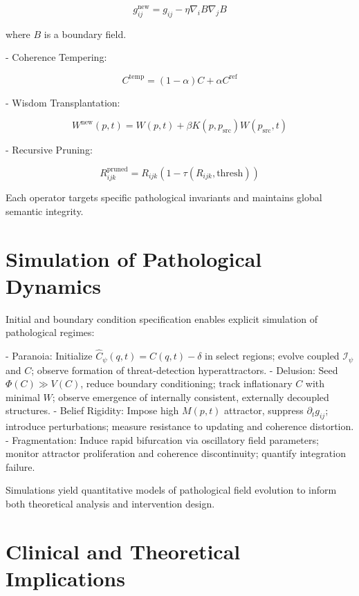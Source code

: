 \begin{equation}
g_{ij}^{\text{new}} = g_{ij} - \eta \nabla_i B \nabla_j B
\end{equation}

where $B$ is a boundary field.

- Coherence Tempering:

\begin{equation}
C^{\text{temp}} = (1-\alpha)C + \alpha C^{\text{ref}}
\end{equation}

- Wisdom Transplantation:

\begin{equation}
W^{\text{new}}(p,t) = W(p,t) + \beta K(p,p_{\text{src}}) W(p_{\text{src}},t)
\end{equation}

- Recursive Pruning:

\begin{equation}
R_{ijk}^{\text{pruned}} = R_{ijk} (1 - \tau(R_{ijk}, \text{thresh}))
\end{equation}

Each operator targets specific pathological invariants and maintains global semantic integrity.

\section{Simulation of Pathological Dynamics}

Initial and boundary condition specification enables explicit simulation of pathological regimes:

- Paranoia: Initialize $\hat{C}_{\psi}(q,t) = C(q,t) - \delta$ in select regions; evolve coupled $\mathcal{I}_{\psi}$ and $C$; observe formation of threat-detection hyperattractors.
- Delusion: Seed $\Phi(C) \gg V(C)$, reduce boundary conditioning; track inflationary $C$ with minimal $W$; observe emergence of internally consistent, externally decoupled structures.
- Belief Rigidity: Impose high $M(p,t)$ attractor, suppress $\partial_t g_{ij}$; introduce perturbations; measure resistance to updating and coherence distortion.
- Fragmentation: Induce rapid bifurcation via oscillatory field parameters; monitor attractor proliferation and coherence discontinuity; quantify integration failure.

Simulations yield quantitative models of pathological field evolution to inform both theoretical analysis and intervention design.

\section{Clinical and Theoretical Implications}

